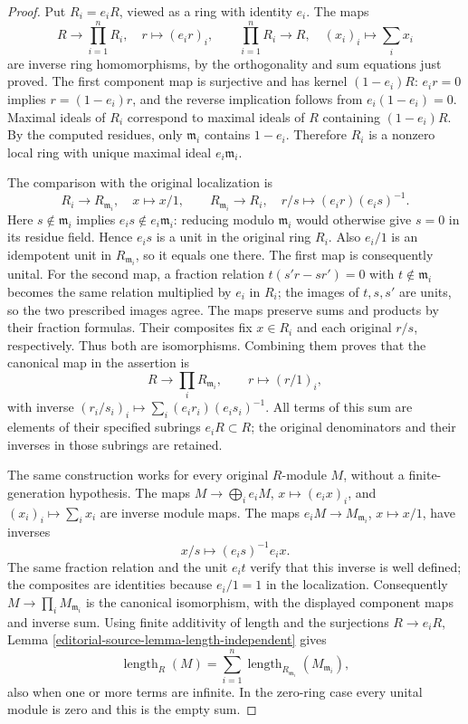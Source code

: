 \begin{proof}
Put $R_i=e_iR$, viewed as a ring with identity $e_i$.
The maps
$$
R\longrightarrow\prod_{i=1}^n R_i,\quad r\longmapsto(e_ir)_i,
\qquad
\prod_{i=1}^n R_i\longrightarrow R,\quad (x_i)_i\longmapsto\sum_i x_i
$$
are inverse ring homomorphisms, by the orthogonality and sum
equations just proved. The first component map is surjective
and has kernel $(1-e_i)R$: $e_ir=0$ implies
$r=(1-e_i)r$, and the reverse implication follows from
$e_i(1-e_i)=0$.
Maximal ideals of $R_i$ correspond to maximal ideals of $R$
containing $(1-e_i)R$. By the computed residues, only
$\mathfrak m_i$ contains $1-e_i$.
Therefore $R_i$ is a nonzero local ring with unique maximal
ideal $e_i\mathfrak m_i$.

The comparison with the original localization is
$$
R_i\longrightarrow R_{\mathfrak m_i},\quad x\longmapsto x/1,
\qquad
R_{\mathfrak m_i}\longrightarrow R_i,\quad
r/s\longmapsto (e_ir)(e_is)^{-1}.
$$
Here $s\notin\mathfrak m_i$ implies
$e_is\notin e_i\mathfrak m_i$: reducing modulo
$\mathfrak m_i$ would otherwise give $s=0$ in its residue
field. Hence $e_is$ is a unit in the original ring $R_i$.
Also $e_i/1$ is an idempotent unit in $R_{\mathfrak m_i}$,
so it equals one there. The first map is consequently unital.
For the second map, a fraction relation
$t(s'r-sr')=0$ with $t\notin\mathfrak m_i$ becomes the
same relation multiplied by $e_i$ in $R_i$; the images of
$t,s,s'$ are units, so the two prescribed images agree.
The maps preserve sums and products by their fraction formulas.
Their composites fix $x\in R_i$ and each original $r/s$,
respectively. Thus both are isomorphisms.
Combining them proves that the canonical map in the assertion is
$$
R\longrightarrow\prod_i R_{\mathfrak m_i},\qquad r\longmapsto(r/1)_i,
$$
with inverse
$(r_i/s_i)_i\mapsto\sum_i(e_ir_i)(e_is_i)^{-1}$.
All terms of this sum are elements of their specified subrings
$e_iR\subset R$; the original denominators and their inverses
in those subrings are retained.

The same construction works for every original $R$-module $M$,
without a finite-generation hypothesis. The maps
$M\to\bigoplus_i e_iM$, $x\mapsto(e_ix)_i$, and
$(x_i)_i\mapsto\sum_i x_i$ are inverse module maps.
The maps $e_iM\to M_{\mathfrak m_i}$, $x\mapsto x/1$,
have inverses
$$
x/s\longmapsto(e_is)^{-1}e_ix.
$$
The same fraction relation and the unit $e_it$ verify that this
inverse is well defined; the composites are identities because
$e_i/1=1$ in the localization.
Consequently $M\to\prod_i M_{\mathfrak m_i}$ is the canonical
isomorphism, with the displayed component maps and inverse sum.
Using finite additivity of length and the surjections
$R\to e_iR$, Lemma \ref{editorial-source-lemma-length-independent} gives
$$
\operatorname{length}_R(M)
=\sum_{i=1}^n\operatorname{length}_{R_{\mathfrak m_i}}
 (M_{\mathfrak m_i}),
$$
also when one or more terms are infinite. In the zero-ring case
every unital module is zero and this is the empty sum.
\end{proof}